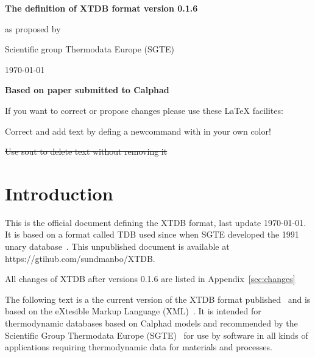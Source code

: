 \documentclass{article}
\begin{document}
\newcommand{\xtdbva}{0}
\newcommand{\xtdbvb}{1}
\newcommand{\xtdbvc}{6 }

\begin{center}

  {\Large \bf The definition of XTDB format version \xtdbva.\xtdbvb.\xtdbvc}

  as proposed by

  Scientific group Thermodata Europe (SGTE)



  \today

\end{center}

{\bf Based on paper submitted to Calphad~\cite{25xtdb}}

\newcommand{\bosse}[1]{{\color{magenta} #1}}

If you want to correct or propose changes please use these LaTeX facilites:

\bosse{Correct and add text by defing a newcommand with in your own color!}

\sout{Use sout to delete text without removing it}

\section{Introduction}

This is the official document defining the XTDB format, last update
\today.  It is based on a format called TDB used since when SGTE
developed the 1991 unary database~\cite{91Din}.  This unpublished
document is available at https://gtihub.com/sundmanbo/XTDB.

All changes of XTDB after versions 0.1.6 are listed in Appendix~\ref{sec:changes}

The following text is a the current version of the XTDB format
published~\cite{25xtdb} and is based on the eXtesible Markup Language
(XML)~\cite{XML}.  It is intended for thermodynamic databases based on
Calphad models and recommended by the Scientific Group Thermodata
Europe (SGTE)~\cite{SGTE} for use by software in all kinds of
applications requiring thermodynamic data for materials and processes.
\end{document}
